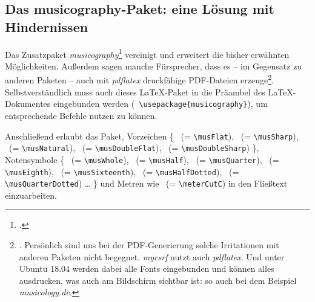 %
%
%



\subsection{Das musicography-Paket: eine Lösung mit Hindernissen}

Das Zusatzpaket \textit{musicography}\footcite[vgl.][\nopage
wp]{CtanMusicography2018a} vereinigt und erweitert die bisher erwähnten
Möglichkeiten. Außerdem sagen manche Fürsprecher, dass es -- im Gegensatz zu
anderen Paketen -- auch mit \textit{pdflatex} druckfähige PDF-Dateien
erzeuge\footnote{\cite[Vgl. dazu etwa][1]{Cashner2018a}. Persönlich sind uns bei
der PDF-Generierung solche Irritationen mit anderen Paketen nicht begegnet.
\textit{mycsrf} nutzt auch \textit{pdflatex}. Und unter Ubuntu 18.04 werden dabei
alle Fonts eingebunden und können alles ausdrucken, was auch am Bildschirm
sichtbar ist: so auch bei dem Beispiel \textit{musicology.de}.}.
Selbstverständlich muss auch dieses \LaTeX-Paket in die Präambel des
\LaTeX-Dokumentes eingebunden werden (\texttt{\small
\textbackslash{usepackage\{musicography\}}}), um entsprechende Befehle nutzen zu
können.

Anschließend erlaubt das Paket, Vorzeichen \{
\musFlat \ (= \texttt{\small \textbackslash{musFlat}}),
\musSharp \ (= \texttt{\small \textbackslash{musSharp}}),
\musNatural \ (= \texttt{\small \textbackslash{musNatural}}),
\musDoubleFlat \ (= \texttt{\small \textbackslash{musDoubleFlat}}),
\musDoubleSharp \ (= \texttt{\small \textbackslash{musDoubleSharp}})
\}, Notensymbole \{
\musWhole \ (= \texttt{\small \textbackslash{musWhole}}),
\musHalf \ (= \texttt{\small \textbackslash{musHalf}}),
\musQuarter \ (= \texttt{\small \textbackslash{musQuarter}}),
\musEighth \ (= \texttt{\small \textbackslash{musEighth}}),
\musSixteenth \ (= \texttt{\small \textbackslash{musSixteenth}}),
\musHalfDotted \ (= \texttt{\small \textbackslash{musHalfDotted}}),
\musQuarterDotted \ (= \texttt{\small \textbackslash{musQuarterDotted}})
\ldots
\}
und Metren wie \meterCutC \ (= \texttt{\small \textbackslash{meterCutC}})
in den Fließtext einzuarbeiten.

